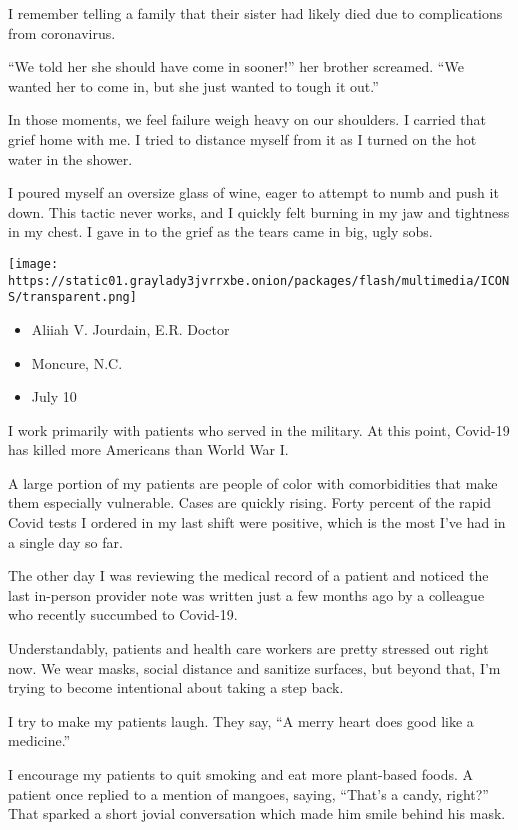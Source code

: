 I remember telling a family that their sister had likely died due to
complications from coronavirus.

``We told her she should have come in sooner!'' her brother screamed.
``We wanted her to come in, but she just wanted to tough it out.''

In those moments, we feel failure weigh heavy on our shoulders. I
carried that grief home with me. I tried to distance myself from it as I
turned on the hot water in the shower.

I poured myself an oversize glass of wine, eager to attempt to numb and
push it down. This tactic never works, and I quickly felt burning in my
jaw and tightness in my chest. I gave in to the grief as the tears came
in big, ugly sobs.

\texttt{[image: https://static01.graylady3jvrrxbe.onion/packages/flash/multimedia/ICONS/transparent.png]}

\begin{itemize}
\tightlist
\item
  Aliiah V. Jourdain, E.R. Doctor
\item
  Moncure, N.C.
\item
  July 10
\end{itemize}

I work primarily with patients who served in the military. At this
point, Covid-19 has killed more Americans than World War I.

A large portion of my patients are people of color with comorbidities
that make them especially vulnerable. Cases are quickly rising. Forty
percent of the rapid Covid tests I ordered in my last shift were
positive, which is the most I've had in a single day so far.

The other day I was reviewing the medical record of a patient and
noticed the last in-person provider note was written just a few months
ago by a colleague who recently succumbed to Covid-19.

Understandably, patients and health care workers are pretty stressed out
right now. We wear masks, social distance and sanitize surfaces, but
beyond that, I'm trying to become intentional about taking a step back.

I try to make my patients laugh. They say, ``A merry heart does good
like a medicine.''

I encourage my patients to quit smoking and eat more plant-based foods.
A patient once replied to a mention of mangoes, saying, ``That's a
candy, right?'' That sparked a short jovial conversation which made him
smile behind his mask.

